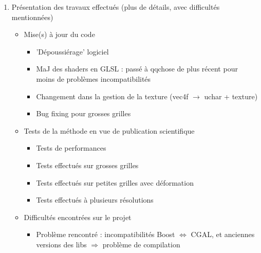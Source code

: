 {{\begin{enumerate}
\begin{itemize}
				\item Chargement de la texture
				\item Génération de maillage tétrahédrique à partir de maillage surfacique englobant (version binaire de la grille $\rightarrow$ maillage tétra, binariser grille $\rightarrow$ dilatation, et maillage autour de ca)
				\item (Rapide) Raymarching/Bresenham pour trouver voxel, et estimer normale et couleur
				\item Note : mentionner le fait que du coup, la complexité revient à la taille du framebuffer, non de la grille
				\item Effet de bord : on peut donc charger des grilles rentrant sur GPU, les déformer afin d'avoir une grille techniquement + grande que espace mémoire GPU
			\end{itemize}
			\item Présentation des travaux effectués (plus de détails, avec difficultés mentionnées)~\begin{itemize}
				\item Mise(s) à jour du code~\begin{itemize}
					\item 'Dépoussiérage' logiciel
					\item MaJ des shaders en GLSL : passé à qqchose de plus récent pour moins de problèmes incompatibilités
					\item Changement dans la gestion de la texture (vec4f $\rightarrow$ uchar + texture)
					\item Bug fixing pour grosses grilles
				\end{itemize}
				\item Tests de la méthode en vue de publication scientifique~\begin{itemize}
					\item Tests de performances
					\item Tests effectués sur grosses grilles
					\item Tests effectués sur petites grilles avec déformation
					\item Tests effectués à plusieurs résolutions
				\end{itemize}
				\item Difficultés encontrées sur le projet~\begin{itemize}
					\item Problème rencontré : incompatibilités Boost $\Leftrightarrow$ CGAL, et anciennes versions des libs $\Rightarrow$ problème de compilation

\end{itemize}
\end{itemize}
\end{enumerate}}}

